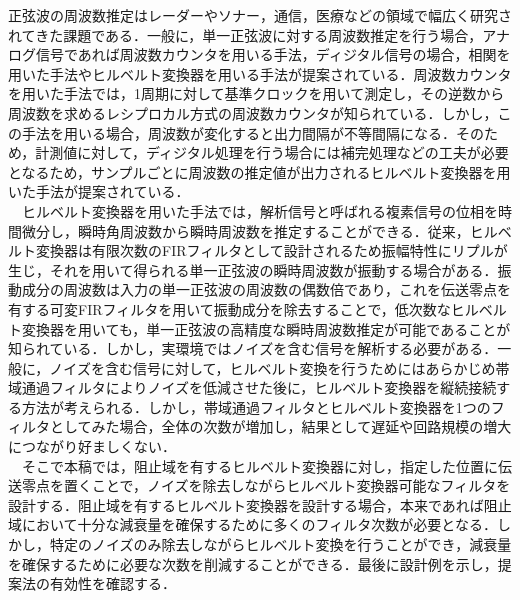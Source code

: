 正弦波の周波数推定はレーダーやソナー，通信，医療などの領域で幅広く研究されてきた課題である．一般に，単一正弦波に対する周波数推定を行う場合，アナログ信号であれば周波数カウンタを用いる手法，ディジタル信号の場合，相関を用いた手法やヒルベルト変換器を用いる手法が提案されている．周波数カウンタを用いた手法では，1周期に対して基準クロックを用いて測定し，その逆数から周波数を求めるレシプロカル方式の周波数カウンタが知られている．しかし，この手法を用いる場合，周波数が変化すると出力間隔が不等間隔になる．そのため，計測値に対して，ディジタル処理を行う場合には補完処理などの工夫が必要となるため，サンプルごとに周波数の推定値が出力されるヒルベルト変換器を用いた手法が提案されている．\\
　ヒルベルト変換器を用いた手法では，解析信号と呼ばれる複素信号の位相を時間微分し，瞬時角周波数から瞬時周波数を推定することができる．従来，ヒルベルト変換器は有限次数のFIRフィルタとして設計されるため振幅特性にリプルが生じ，それを用いて得られる単一正弦波の瞬時周波数が振動する場合がある．振動成分の周波数は入力の単一正弦波の周波数の偶数倍であり，これを伝送零点を有する可変FIRフィルタを用いて振動成分を除去することで，低次数なヒルベルト変換器を用いても，単一正弦波の高精度な瞬時周波数推定が可能であることが知られている．しかし，実環境ではノイズを含む信号を解析する必要がある．一般に，ノイズを含む信号に対して，ヒルベルト変換を行うためにはあらかじめ帯域通過フィルタによりノイズを低減させた後に，ヒルベルト変換器を縦続接続する方法が考えられる．しかし，帯域通過フィルタとヒルベルト変換器を1つのフィルタとしてみた場合，全体の次数が増加し，結果として遅延や回路規模の増大につながり好ましくない．\\
　そこで本稿では，阻止域を有するヒルベルト変換器に対し，指定した位置に伝送零点を置くことで，ノイズを除去しながらヒルベルト変換器可能なフィルタを設計する．阻止域を有するヒルベルト変換器を設計する場合，本来であれば阻止域において十分な減衰量を確保するために多くのフィルタ次数が必要となる．しかし，特定のノイズのみ除去しながらヒルベルト変換を行うことができ，減衰量を確保するために必要な次数を削減することができる．最後に設計例を示し，提案法の有効性を確認する．